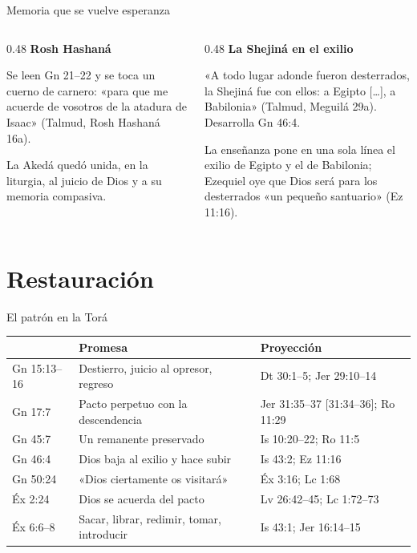 \begin{frame}{Memoria que se vuelve esperanza}
\begin{columns}[T,onlytextwidth]
\begin{column}{0.48\textwidth}\small
\textbf{\textcolor{ladrillo}{Rosh Hashaná}}\par\smallskip
Se leen Gn 21--22 y se toca un cuerno de carnero: «para que me acuerde de vosotros de la atadura de Isaac» (Talmud, Rosh Hashaná 16a).\par\medskip
\begin{clave}
La Akedá quedó unida, en la liturgia, al juicio de Dios y a su memoria compasiva.
\end{clave}
\end{column}
\begin{column}{0.48\textwidth}\small
\textbf{\textcolor{ladrillo}{La Shejiná en el exilio}}\par\smallskip
«A todo lugar adonde fueron desterrados, la Shejiná fue con ellos: a Egipto [\ldots], a Babilonia» (Talmud, Meguilá 29a). Desarrolla Gn 46:4.\par\medskip
\begin{notalam}
La enseñanza pone en una sola línea el exilio de Egipto y el de Babilonia; Ezequiel oye que Dios será para los desterrados «un pequeño santuario» (Ez 11:16).
\end{notalam}
\end{column}
\end{columns}
\end{frame}

\section{Restauración}
\begin{frame}{El patrón en la Torá}
\centering\footnotesize\renewcommand{\arraystretch}{1.25}
\begin{tabular}{>{\RaggedRight\arraybackslash}p{2.0cm}>{\RaggedRight\arraybackslash}p{4.9cm}>{\RaggedRight\arraybackslash}p{4.7cm}}
\toprule
{\leavevmode\color{ladrillo}\bfseries Texto} & {\leavevmode\color{ladrillo}\bfseries Promesa} & {\leavevmode\color{ladrillo}\bfseries Proyección}\\\midrule
Gn 15:13--16 & Destierro, juicio al opresor, regreso & Dt 30:1--5; Jer 29:10--14\\
Gn 17:7 & Pacto perpetuo con la descendencia & Jer 31:35--37 [31:34--36]; Ro 11:29\\
Gn 45:7 & Un remanente preservado & Is 10:20--22; Ro 11:5\\
Gn 46:4 & Dios baja al exilio y hace subir & Is 43:2; Ez 11:16\\
Gn 50:24 & «Dios ciertamente os visitará» & Éx 3:16; Lc 1:68\\
Éx 2:24 & Dios se acuerda del pacto & Lv 26:42--45; Lc 1:72--73\\
Éx 6:6--8 & Sacar, librar, redimir, tomar, introducir & Is 43:1; Jer 16:14--15\\
\bottomrule
\end{tabular}
\elabpropia
\end{frame}

